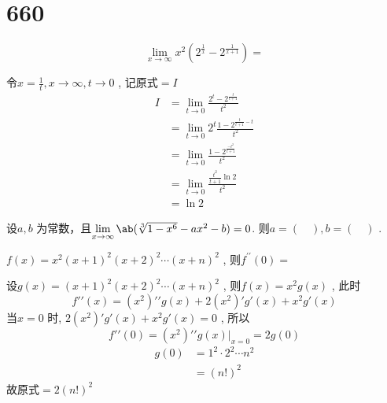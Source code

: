 \section{660}

\begin{question}
    \begin{equation*}
        \lim\limits_{x \to \infty} x^2 (2^{\frac{1}{x}} - 2^{\frac{1}{x + 1}}) = 
    \end{equation*}
\end{question}

\begin{solution}
    令$ x = \frac 1 t , x \to \infty, t \to 0 $ , 记原式$ = I $ 
    \begin{align*}
        I &= \lim\limits_{t \to 0} \frac{ 2^t - 2^{ \frac{t}{t + 1} } }{t^2} \\
          &= \lim\limits_{t \to 0} 2^t \frac{ 1 - 2^{ \frac{t}{t + 1} - t } }{t^2}  \\
          &= \lim\limits_{t \to 0} \frac{ 1 - 2^{ \frac{-t^2}{t + 1} } }{t^2}   \\
          &= \lim\limits_{t \to 0} \frac{ \frac{t^2}{t + 1} \ln2 }{t^2} \\
          &= \ln2
    \end{align*}
\end{solution}

\begin{question}
    设$ a, b $ 为常数，且$ \lim\limits_{x \to \infty} \ab(\sqrt[3]{1 - x^6} - ax^2 - b) = 0 $. 则$ a = (\quad), b = (\quad) $ . 
\end{question}

\begin{question}
    $ f(x) = x^2 (x + 1)^2 (x + 2)^2 \cdots (x + n)^2 $ , 则$ f^{\prime \prime}(0) =  $ 
\end{question}

\begin{solution}
    设$ g(x) =(x + 1)^2 (x + 2)^2 \cdots (x + n)^2 $ , 则$ f(x) = x^2 g(x) $ , 此时
    \begin{equation*}
        f\prime\prime(x) = (x^2)\prime\prime g(x) + 2(x^2)\prime g\prime(x) + x^2 g\prime(x)
    \end{equation*}
    当$ x = 0 $ 时,  $ 2(x^2)\prime g\prime(x) + x^2 g\prime(x) = 0 $ , 所以 
    \begin{equation*}
        f\prime\prime(0) = (x^2)\prime\prime g(x) | _{x = 0} = 2g(0)
    \end{equation*}
    \begin{align*}
        g(0) &= 1^2 \cdot 2^2 \cdots n^2     \\
        &= (n!)^2
    \end{align*}
    故原式$ = 2(n!)^2 $ 
\end{solution}

